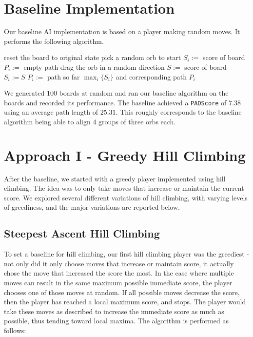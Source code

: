 \documentclass[journal,final,letterpaper,11pt]{IEEEtran}
\begin{document}
\section{Baseline Implementation}
Our baseline AI implementation is based on a player making random moves. It performs the following algorithm.
\begin{algorithmic}[1]
  \STATE reset the board to original state
  \STATE pick a random orb to start
  \STATE $S_i :=$ score of board
  \STATE $P_i :=$ empty path
    \STATE drag the orb in a random direction
    \STATE $S :=$ score of board
      \STATE $S_i := S$
      \STATE $P_i :=$ path so far
    \ENDIF
  \ENDFOR
\ENDFOR
\RETURN $\max_{i}\{S_i\}$ and corresponding path $P_i$
\end{algorithmic}
We generated $100$ boards at random and ran our baseline algorithm on the boards and recorded its performance. The baseline achieved a \texttt{PADScore} of $7.38$ using an average path length of $25.31$. This roughly corresponds to the baseline algorithm being able to align $4$ groups of three orbs each.

\section{Approach I - Greedy Hill Climbing}
After the baseline, we started with a greedy player implemented using hill climbing. The idea was to only take moves that increase or maintain the current score. We explored several different variations of hill climbing, with varying levels of greediness, and the major variations are reported below.

\subsection{Steepest Ascent Hill Climbing}
To set a baseline for hill climbing, our first hill climbing player was the greediest - not only did it only choose moves that increase or maintain score, it actually chose the move that increased the score the most. In the case where multiple moves can result in the same maximum possible immediate score, the player chooses one of those moves at random. If all possible moves decrease the score, then the player has reached a local maximum score, and stops. The player would take these moves as described to increase the immediate score as much as possible, thus tending toward local maxima. The algorithm is performed as follows:
\end{document}
